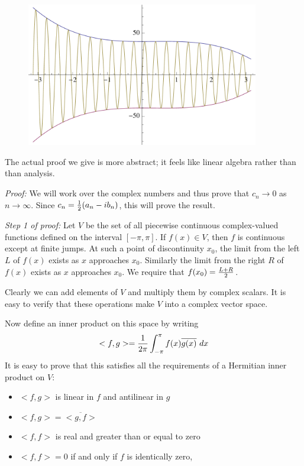 \documentclass[11pt, oneside]{amsart}
\begin{document}
\begin{figure}[htbp] %
   \centering
   \includegraphics[width=4in]{Graphics/five}
\end{figure}



The actual proof we give is more abstract; it feels  like linear algebra rather than than analysis.

{\em Proof:} We will work over the complex numbers and thus prove that $c_n \rightarrow 0$ as $n \rightarrow \infty$. Since $c_n = {1 \over 2} (a_n - i b_n)$, this will prove the result.

{\em Step 1 of proof:} Let $V$ be the set of all piecewise continuous complex-valued functions defined on the interval
$[ - \pi, \pi]$. If $f(x) \in V$, then $f$ is continuous except at finite jumps. At such a point of discontinuity $x_0$,
the limit from the left $L$ of $f(x)$ exists as $x$ approaches $x_0$. Similarly the limit from the right $R$ of $f(x)$ exists as $x$ approaches $x_0$. We require that $f(x_0) = {{L + R} \over 2}$.

Clearly we can add elements of $V$ and multiply them by complex scalars. It is easy to verify that these operations make $V$ into a complex vector space.

Now define an inner product on this space by writing $$< f, g > = {1 \over {2 \pi}} \int_{- \pi}^\pi f(x) \overline{g(x)} \ dx$$ 
It is easy to prove that this satisfies all the requirements of a Hermitian inner product on $V$:
\begin{itemize}
\item $<f, g>$ is linear in $f$ and antilinear in $g$
\item $<f, g> = \overline{<g, f>}$
\item $<f, f>$ is real and greater than or equal to zero
\item $<f, f> = 0$ if and only if $f$ is identically zero,
\end{itemize}
\end{document}
